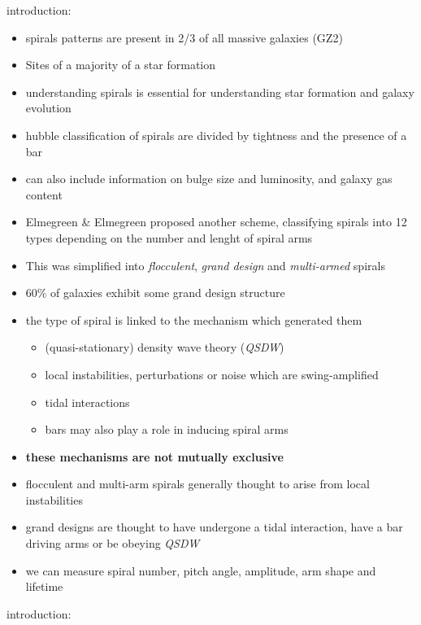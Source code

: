 
\citet{2014PASA...31...35D} introduction:

\begin{itemize}
  \item spirals patterns are present in 2/3 of all massive galaxies (GZ2)
  \item Sites of a majority of a star formation
  \item understanding spirals is essential for understanding star formation and galaxy evolution
  \item hubble classification of spirals are divided by tightness and the presence of a bar
  \item can also include information on bulge size and luminosity, and galaxy gas content
  \item Elmegreen \& Elmegreen proposed another scheme, classifying spirals into 12 types depending on the number and lenght of spiral arms
  \item This was simplified into \textit{flocculent}, \textit{grand design} and \textit{multi-armed} spirals
  \item 60\% of galaxies exhibit some grand design structure
  \item the type of spiral is linked to the mechanism which generated them
  \begin{itemize}
    \item (quasi-stationary) density wave theory (\textit{QSDW})
    \item local instabilities, perturbations or noise which are swing-amplified
    \item tidal interactions
    \item bars may also play a role in inducing spiral arms
  \end{itemize}
  \item \textbf{these mechanisms are not mutually exclusive}
  \item flocculent and multi-arm spirals generally thought to arise from local instabilities
  \item grand designs are thought to have undergone a tidal interaction, have a bar driving arms or be obeying \textit{QSDW}
  \item we can measure spiral number, pitch angle, amplitude, arm shape and lifetime
\end{itemize}

\citet{2019MNRAS.487.1808M} introduction:

